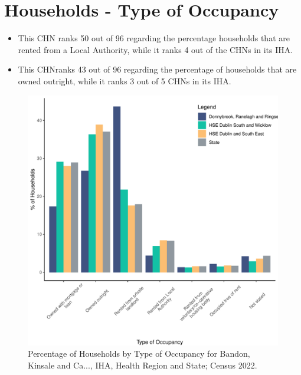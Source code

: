 \documentclass{article}
\begin{document}
\section{Households - Type of Occupancy}\label{sect:Households}
\begin{itemize}
\item This CHN ranks  50 out of 96 regarding the percentage households that are rented from a Local Authority, while it ranks  4 out of the CHNs in its IHA. 
\item This CHNranks  43 out of 96 regarding the percentage of households that are owned outright, while it ranks   3 out of 5 CHNs in its IHA.
\end{itemize}
\begin{figure}[H]
	\centering
	\includegraphics[width = 140mm]{../figures/HouseholdsED.pdf}
	\caption{Percentage of Households by Type of Occupancy for Bandon, Kinsale and Ca..., IHA, Health Region and State; Census 2022.}
	\label{fig:vbnv}
	\end{figure}
\end{document}
